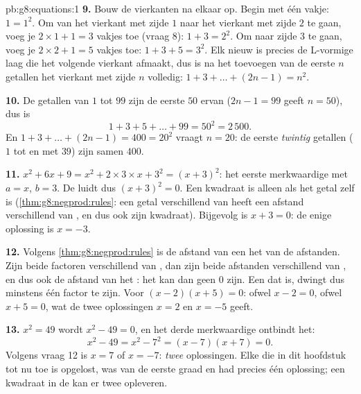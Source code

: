 \begin{solution}{pb:g8:equations:1}
\textbf{9.} Bouw de vierkanten na elkaar op. Begin met één vakje: $1 = 1^2$. Om
van het vierkant met zijde $1$ naar het vierkant met zijde $2$ te gaan, voeg je
$2 \times 1 + 1 = 3$ vakjes toe (vraag 8): $1 + 3 = 2^2$. Om naar zijde $3$ te
gaan, voeg je $2 \times 2 + 1 = 5$ vakjes toe: $1 + 3 + 5 = 3^2$. Elk nieuw
 is precies de L-vormige laag die het volgende vierkant afmaakt, dus
is na het toevoegen van de eerste $n$  getallen het vierkant met zijde $n$
volledig: $1 + 3 + \dots + (2n - 1) = n^2$.

\textbf{10.} De  getallen van $1$ tot $99$ zijn de eerste $50$ ervan
($2n - 1 = 99$ geeft $n = 50$), dus is
\[
1 + 3 + 5 + \dots + 99 = 50^2 = 2\,500 .
\]
En $1 + 3 + \dots + (2n - 1) = 400 = 20^2$ vraagt $n = 20$: de eerste
\emph{twintig}  getallen ($1$ tot en met $39$) zijn samen $400$.

\textbf{11.} $x^2 + 6x + 9 = x^2 + 2 \times 3 \times x + 3^2 = (x + 3)^2$: het
eerste merkwaardige  met $a = x$, $b = 3$. De  luidt dus
$(x + 3)^2 = 0$. Een kwadraat is alleen  als het getal zelf  is
(\cref{thm:g8:negprod:rules}: een getal verschillend van  heeft een afstand
verschillend van , en dus ook zijn kwadraat). Bijgevolg is $x + 3 = 0$: de
enige oplossing is $x = -3$.

\textbf{12.} Volgens \cref{thm:g8:negprod:rules} is de afstand van een 
het  van de afstanden. Zijn beide factoren verschillend van , dan zijn
beide afstanden verschillend van , en dus ook de afstand van het : het
 kan dan geen $0$ zijn. Een  dat  is, dwingt dus minstens één
factor  te zijn. Voor $(x - 2)(x + 5) = 0$: ofwel $x - 2 = 0$, ofwel
$x + 5 = 0$, wat de twee oplossingen $x = 2$ en $x = -5$ geeft.

\textbf{13.} $x^2 = 49$ wordt $x^2 - 49 = 0$, en het derde merkwaardige 
ontbindt het:
\[
x^2 - 49 = x^2 - 7^2 = (x - 7)(x + 7) = 0 .
\]
Volgens vraag 12 is $x = 7$ of $x = -7$: \emph{twee} oplossingen. Elke
 die in dit hoofdstuk tot nu toe is opgelost, was van de eerste graad
en had precies één oplossing; een kwadraat in de  kan er twee
opleveren.


\end{solution}
